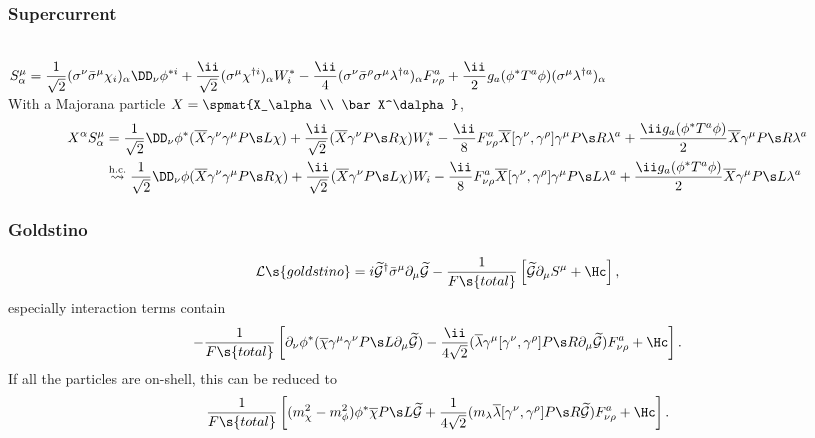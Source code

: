 \subsubsection{Supercurrent}
\\
$\displaystyle S^\mu_\alpha = \frac{1}{\sqrt2}(\Sn\bSm\chi_i)_\alpha\Dn\phi^{*i} + \frac{\ii}{\sqrt2}(\Sm\chi^{\dagger i})_\alpha W_i^* -\frac{\ii}{4}(\Sn\bSr\Sm\lambda^{\dagger a})_\alpha F^a_{\nu\rho}
+\frac{\ii}{2}g_a(\phi^*T^a\phi)(\Sm\lambda^{\dagger a})_\alpha$\\
With a Majorana particle $X=\spmat{X_\alpha\\ \bar X^\dalpha}$,\vspace{-10pt}
\begin{align*}
X^\alpha S^\mu_\alpha&=
  \frac1{\sqrt2}\Dn\phi^*(\overline X\Gn\Gm\PL\chi) + \frac{\ii}{\sqrt2}(\overline X\Gn\PR\chi)W_i^*-\frac{\ii}{8}F^a_{\nu\rho}\overline X[\Gn,\Gr]\Gm\PR\lambda^a+\frac{\ii g_a(\phi^* T^a\phi)}{2}\overline X\Gm\PR\lambda^a\\
&\buildrel{\text{h.c.}}\over\leadsto
 \frac1{\sqrt2}\Dn\phi(\overline X\Gn\Gm\PR\chi) + \frac{\ii}{\sqrt2}(\overline X\Gn\PL\chi)W_i-\frac{\ii}{8}F^a_{\nu\rho}\overline X[\Gn,\Gr]\Gm\PL\lambda^a+
\frac{\ii g_a(\phi^* T^a\phi)}{2}\overline X\Gm\PL\lambda^a\\
 \end{align*}

\subsubsection{Goldstino}
\begin{equation}
 \Lag\s{goldstino}=i\goldi^\dagger \bSm\Pm\goldi-\frac{1}{F\s{total}}\left[\goldi\Pm S^\mu+\Hc\right],
\end{equation}
especially interaction terms contain\\
\begin{equation}
-\frac{1}{F\s{total}}
\left[\Pn\phi^*(\overline\chi\Gm\Gn\PL\Pm\goldi)-\frac{\ii}{4\sqrt2}(\overline\lambda\Gm[\Gn,\Gr]\PR\Pm\goldi)F^a_{\nu\rho}+\Hc\right].
\end{equation}
If all the particles are on-shell, this can be reduced to
\begin{equation}
\frac{1}{F\s{total}}
\left[
(m_\chi^2-m_\phi^2)\phi^*\overline\chi\PL\goldi
+\frac{1}{4\sqrt2}(m_\lambda \overline\lambda[\Gn,\Gr]\PR\goldi)F^a_{\nu\rho}
+\Hc\right].
\end{equation}

